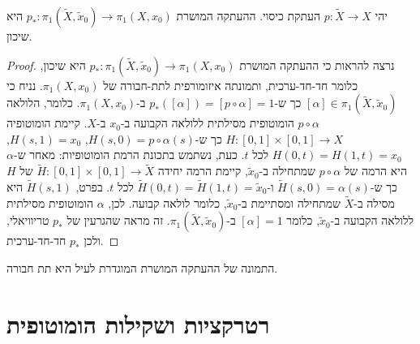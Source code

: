 \documentclass{tstextbook}
\begin{document}
\begin{proposition}
יהי \(p:\tilde{X}\to X\) העתקת כיסוי. ההעתקה המושרת \(p_{*}:\pi_{1}\left( \tilde{X},\tilde{x}_{0} \right)\to \pi_{1}(X,x_{0})\) היא שיכון.

\end{proposition}
\begin{proof}
נרצה להראות כי ההעתקה המושרת \(p_{*}:\pi_{1}\left( \tilde{X},\tilde{x}_{0} \right)\to \pi_{1}(X,x_{0})\) היא שיכון, כלומר חד-חד-ערכית, ותמונתה איזומורפית לתת-חבורה של \(\pi_{1}(X,x_{0})\).
נניח כי \([\alpha] \in \pi_{1}\left( \tilde{X},\tilde{x}_{0} \right)\) כך ש-\(p_{*}([\alpha]) = [p \circ \alpha] = 1\) ב-\(\pi_{1}(X,x_{0})\). כלומר, הלולאה \(p \circ \alpha\) הומוטופית מסילתית ללולאה הקבועה ב-\(x_{0}\) ב-\(X\). קיימת הומוטופיה \(H:[0,1]\times[0,1]\to X\) כך ש-\(H(s,0) = p \circ \alpha(s)\), \(H(s,1) = x_{0}\), \(H(0,t) = H(1,t) = x_{0}\) לכל \(t\).
כעת, נשתמש בתכונת הרמת הומוטופיות: מאחר ש-\(\alpha\) היא הרמה של \(p \circ \alpha\) שמתחילה ב-\(\tilde{x}_{0}\), קיימת הרמה יחידה \(\tilde{H}:[0,1]\times[0,1]\to \tilde{X}\) של \(H\) כך ש-\(\tilde{H}(s,0) = \alpha(s)\) ו-\(\tilde{H}(0,t) = \tilde{H}(1,t) = \tilde{x}_{0}\) לכל \(t\).
בפרט, \(\tilde{H}(s,1)\) היא מסילה ב-\(\tilde{X}\) שמתחילה ומסתיימת ב-\(\tilde{x}_{0}\), כלומר לולאה קבועה. לכן, \(\alpha\) הומוטופית מסילתית ללולאה הקבועה ב-\(\tilde{x}_{0}\), כלומר \([\alpha] = 1\) ב-\(\pi_{1}\left( \tilde{X},\tilde{x}_{0} \right)\). זה מראה שהגרעין של \(p_{*}\) טריוויאלי, ולכן \(p_{*}\) חד-חד-ערכית.

\end{proof}
\begin{corollary}
התמונה של ההעתקה המושרת המוגדרת לעיל היא תת חבורה.

\end{corollary}
\section{רטרקציות ושקילות הומוטופית}
\end{document}
